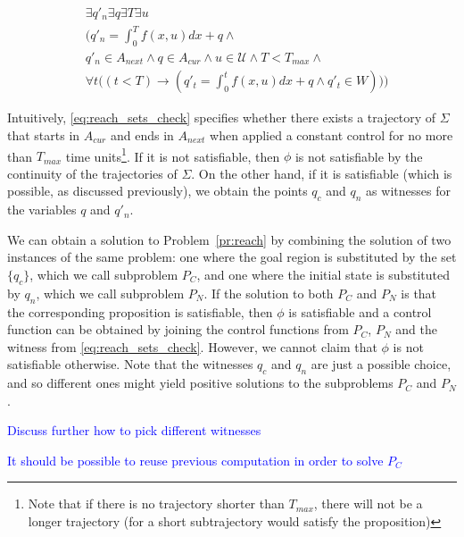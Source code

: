 \documentclass[12pt]{article}
\newcommand\fran[1]{\textcolor{blue}{#1}}
\begin{document}
\begin{equation}
    \label{eq:reach_sets_check}
    \begin{split}
        &\exists q'_n \exists q \exists T \exists u \\
        &\bigg(
            q'_n = \int_{0}^{T} f(x, u) dx + q \land \\
        &q'_n \in A_{next} \land 
            q \in A_{cur} \land
            u \in \mathcal{U} \land
            T < T_{max} \land \\
        &\forall t \Big((t < T) \rightarrow 
            (q'_t = \int_{0}^{t} f(x, u) dx + q \land 
            q'_t \in W )\Big)
        \bigg)
    \end{split}
\end{equation}

Intuitively, \eqref{eq:reach_sets_check} specifies whether there exists a trajectory of $\Sigma$ that starts in $A_{cur}$ and ends in $A_{next}$ when applied a constant control for no more than $T_{max}$ time units\footnote{Note that if there is no trajectory shorter than $T_{max}$, there will not be a longer trajectory (for a short subtrajectory would satisfy the proposition)}. If it is not satisfiable, then $\phi$ is not satisfiable by the continuity of the trajectories of $\Sigma$. On the other hand, if it is satisfiable (which is possible, as discussed previously), we obtain the points $q_c$ and $q_n$ as witnesses for the variables $q$ and $q'_n$. 

We can obtain a solution to Problem~\ref{pr:reach} by combining the solution of two instances of the same problem: one where the goal region is substituted by the set $\{q_c\}$, which we call subproblem $P_C$, and one where the initial state is substituted by $q_n$, which we call subproblem $P_N$. If the solution to both $P_C$ and $P_N$ is that the corresponding proposition is satisfiable, then $\phi$ is satisfiable and a control function can be obtained by joining the control functions from $P_C$, $P_N$ and the witness from \eqref{eq:reach_sets_check}. However, we cannot claim that $\phi$ is not satisfiable otherwise. Note that the witnesses $q_c$ and $q_n$ are just a possible choice, and so different ones might yield positive solutions to the subproblems $P_C$ and $P_N$.

\fran{Discuss further how to pick different witnesses}

\fran{It should be possible to reuse previous computation in order to solve $P_C$}
\end{document}
